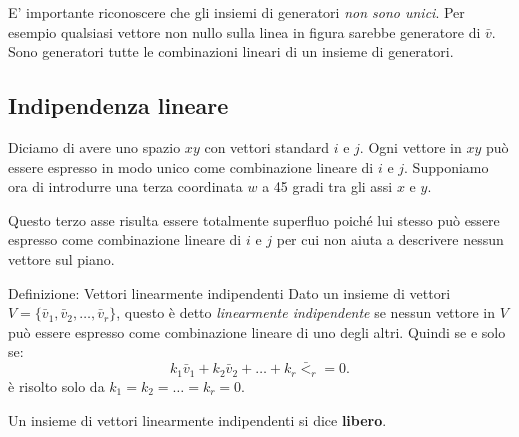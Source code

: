 \documentclass[x11names]{article}
\begin{document}
\noindent
E' importante riconoscere che gli insiemi di generatori \textit{non sono unici}. Per esempio qualsiasi vettore non nullo sulla linea in figura sarebbe generatore  di $\bar{v}$. Sono generatori tutte le combinazioni lineari di un insieme di generatori.

\subsection{Indipendenza lineare}
Diciamo di avere uno spazio $xy$ con vettori standard $i$ e $j$. Ogni vettore in $xy$ può essere espresso in modo unico come combinazione lineare di $i$ e $j$. Supponiamo ora di introdurre una terza coordinata $w$ a 45 gradi tra gli assi $x$ e $y$. 

Questo terzo asse risulta essere totalmente superfluo poiché lui stesso può essere espresso come combinazione lineare di $i$ e $j$ per cui non aiuta a descrivere nessun vettore sul piano.


\begin{center}
\colorbox{myblue}{\begin{minipage}{5.75in}
\begin{blues}{Definizione: Vettori linearmente indipendenti}
Dato un insieme di vettori $V=\{\bar{v}_1,\bar{v}_2,\dots,\bar{v}_{r}\}$, questo  è detto \textit{linearmente indipendente} se nessun vettore in $V$ può essere espresso come combinazione lineare di uno degli altri. Quindi se e solo se:
\[
k_1\bar{v}_1 + k_2\bar{v}_2 + \dots + k_r\bar{<}_r = 0
.\] 
è risolto solo da $k_1 =k_2= \dots = k_r =0$.

Un insieme di vettori linearmente indipendenti si dice \textbf{libero}.
\end{blues}
\end{minipage}}        
\end{center}
\end{document}
